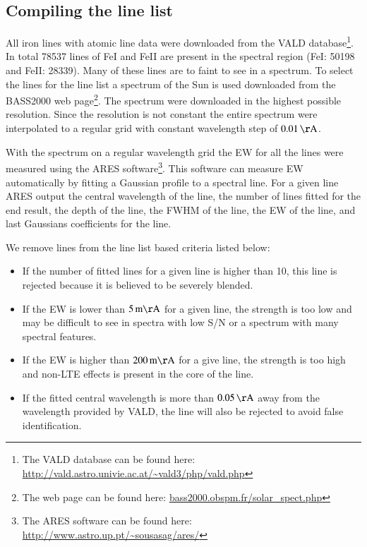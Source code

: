 \documentclass{aa}
\begin{document}
\subsection{Compiling the line list}
All iron lines with atomic line data were downloaded from the
VALD database\footnote{The VALD database can be found here:
\url{http://vald.astro.univie.ac.at/~vald3/php/vald.php}}. In total
78537 lines of FeI and FeII are present in the spectral region (FeI:
50198 and FeII: 28339). Many of these lines are to faint to see in a
spectrum. To select the lines for the line list a spectrum of the Sun
is used downloaded from the BASS2000 web page\footnote{The web page can
be found here: \url{bass2000.obspm.fr/solar_spect.php}}. The spectrum
were downloaded in the highest possible resolution. Since the resolution
is not constant the entire spectrum were interpolated to a regular grid
with constant wavelength step of $\SI{0.01}{\AA}$.

With the spectrum on a regular wavelength grid the
EW for all the lines were measured using the ARES
software\footnote{The ARES software can be found here:
\url{http://www.astro.up.pt/~sousasag/ares/}}\citep{Sousa2007}. This
software can measure EW automatically by fitting a Gaussian profile to
a spectral line. For a given line ARES output the central wavelength of
the line, the number of lines fitted for the end result, the depth of
the line, the FWHM of the line, the EW of the line, and last Gaussians
coefficients for the line.

We remove lines from the line list based criteria listed below:
\begin{itemize}
    \item If the number of fitted lines for a given line is higher than 10,
        this line is rejected because it is believed to be severely blended.
    \item If the EW is lower than $\SI{5}{m\AA}$ for a given line, the strength
        is too low and may be difficult to see in spectra with low S/N or a
        spectrum with many spectral features.
    \item If the EW is higher than $\SI{200}{m\AA}$ for a give line, the strength
        is too high and non-LTE effects is present in the core of the line.
    \item If the fitted central wavelength is more than $\SI{0.05}{\AA}$ away
        from the wavelength provided by VALD, the line will also be rejected to
        avoid false identification.
\end{itemize}
\end{document}
